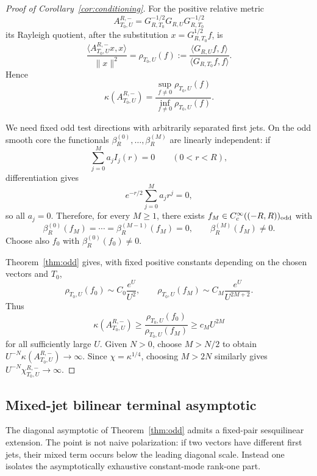 
\begin{proof}[Proof of Corollary~\ref{cor:conditioning}]
For the positive relative metric
\[
 A_{T_0,U}^{R,-}
 =G_{R,T_0}^{-1/2}G_{R,U}G_{R,T_0}^{-1/2}
\]
its Rayleigh quotient, after the substitution
$x=G_{R,T_0}^{1/2}f$, is
\[
 \frac{\langle A_{T_0,U}^{R,-}x,x\rangle}{\|x\|^2}
 =\rho_{T_0,U}(f)
 :=\frac{\langle G_{R,U}f,f\rangle}
 {\langle G_{R,T_0}f,f\rangle}.
\tag{COND.1}\label{eq:conditioning-rayleigh}
\]
Hence
\[
 \kappa(A_{T_0,U}^{R,-})
 =\frac{\sup_{f\ne0}\rho_{T_0,U}(f)}
 {\inf_{f\ne0}\rho_{T_0,U}(f)}.
\tag{COND.2}\label{eq:conditioning-kappa}
\]

We need fixed odd test directions with arbitrarily separated first jets.  On the odd
smooth core the functionals $\beta_R^{(0)},\dots,\beta_R^{(M)}$ are linearly independent:
if
\[
 \sum_{j=0}^{M}a_j I_j(r)=0\qquad(0<r<R),
\]
differentiation gives
\[
 e^{-r/2}\sum_{j=0}^{M}a_jr^j=0,
\]
so all $a_j=0$.  Therefore, for every $M\ge1$, there exists
$f_M\in C_c^\infty((-R,R))_{\rm odd}$ with
\[
 \beta_R^{(0)}(f_M)=\cdots=\beta_R^{(M-1)}(f_M)=0,
 \qquad
 \beta_R^{(M)}(f_M)\ne0.
\tag{COND.3}\label{eq:conditioning-testjets}
\]
Choose also $f_0$ with $\beta_R^{(0)}(f_0)\ne0$.

Theorem~\ref{thm:odd} gives, with fixed positive constants depending on the chosen
vectors and $T_0$,
\[
 \rho_{T_0,U}(f_0)
 \sim C_0\frac{e^U}{U^2},
 \qquad
 \rho_{T_0,U}(f_M)
 \sim C_M\frac{e^U}{U^{2M+2}}.
\]
Thus
\[
 \kappa(A_{T_0,U}^{R,-})
 \ge\frac{\rho_{T_0,U}(f_0)}{\rho_{T_0,U}(f_M)}
 \ge c_MU^{2M}
\tag{COND.4}\label{eq:conditioning-polylower}
\]
for all sufficiently large $U$.  Given $N>0$, choose $M>N/2$ to obtain
$U^{-N}\kappa(A_{T_0,U}^{R,-})\to\infty$.  Since
$\chi=\kappa^{1/4}$, choosing $M>2N$ similarly gives
$U^{-N}\chi_{T_0,U}^{R,-}\to\infty$.
\end{proof}

\subsection{Mixed-jet bilinear terminal asymptotic}\label{subsec:mixed-jet}

The diagonal asymptotic of Theorem~\ref{thm:odd} admits a fixed-pair sesquilinear
extension.  The point is not naive polarization: if two vectors have different first
jets, their mixed term occurs below the leading diagonal scale.  Instead one isolates
the asymptotically exhaustive constant-mode rank-one part.

